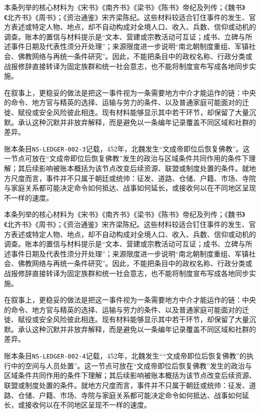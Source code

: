 本条列举的核心材料为《宋书》《南齐书》《梁书》《陈书》帝纪及列传；《魏书》《北齐书》《周书》；《资治通鉴》宋齐梁陈纪。这些材料较适合钉住事件的发生、官方表述或特定人物、地点，却不自动构成对全境人口、收入、兵数、信仰或动机的调查。账本的置信与材料提示是“文本、营建或宗教活动可互证；成书、立碑与所述事件日期及代表性须分开处理”；来源限度进一步说明“南北朝制度重组、军镇社会、佛教网络与再统一条件研究”。因此，不能把条目中的政权名称、行政分类或战报修辞直接转译为固定族群和统一社会意志，也不能将制度宣布写成各地同步实施。

在叙事上，更稳妥的做法是把这一事件视为一条需要地方中介才能运作的链：中央的命令、地方官与精英的选择、运输与劳力的条件、以及普通家庭可能面对的迁徙、赋役或安全风险彼此相连。现有材料能够显示其中若干环节，却保留了大量沉默。承认这种沉默并非放弃解释，而是避免以一条编年记录覆盖不同区域和社群的差异。

账本条目\texttt{NS-LEDGER-002-3}记载，452年，北魏发生“文成帝即位后恢复佛教”。这一节点可放在“文成帝即位后恢复佛教”发生的政治与区域条件共同作用的条件下理解；其后续影响被账本概括为该节点改变后续资源、联盟或制度处置的条件。就地方尺度而言，事件并不只属于朝廷或统帅：征发、道路、仓储、户籍、市场、寺院与家庭关系都可能决定命令如何抵达、战事如何延长，或接收何以在不同地区呈现不一样的速度。

本条列举的核心材料为《宋书》《南齐书》《梁书》《陈书》帝纪及列传；《魏书》《北齐书》《周书》；《资治通鉴》宋齐梁陈纪。这些材料较适合钉住事件的发生、官方表述或特定人物、地点，却不自动构成对全境人口、收入、兵数、信仰或动机的调查。账本的置信与材料提示是“文本、营建或宗教活动可互证；成书、立碑与所述事件日期及代表性须分开处理”；来源限度进一步说明“南北朝制度重组、军镇社会、佛教网络与再统一条件研究”。因此，不能把条目中的政权名称、行政分类或战报修辞直接转译为固定族群和统一社会意志，也不能将制度宣布写成各地同步实施。

在叙事上，更稳妥的做法是把这一事件视为一条需要地方中介才能运作的链：中央的命令、地方官与精英的选择、运输与劳力的条件、以及普通家庭可能面对的迁徙、赋役或安全风险彼此相连。现有材料能够显示其中若干环节，却保留了大量沉默。承认这种沉默并非放弃解释，而是避免以一条编年记录覆盖不同区域和社群的差异。

账本条目\texttt{NS-LEDGER-002-4}记载，452年，北魏发生““文成帝即位后恢复佛教”的执行中的空间与人员处置”。这一节点可放在“文成帝即位后恢复佛教”发生的政治与区域条件共同作用的条件下理解；其后续影响被账本概括为该节点改变后续资源、联盟或制度处置的条件。就地方尺度而言，事件并不只属于朝廷或统帅：征发、道路、仓储、户籍、市场、寺院与家庭关系都可能决定命令如何抵达、战事如何延长，或接收何以在不同地区呈现不一样的速度。

